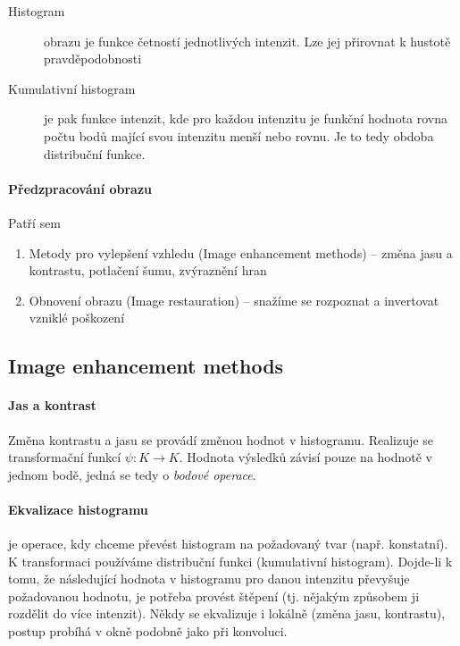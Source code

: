 \begin{description}
\item[Histogram] obrazu je funkce četností jednotlivých intenzit. Lze jej přirovnat k hustotě pravděpodobnosti
\item[Kumulativní histogram] je pak funkce intenzit, kde pro každou intenzitu je funkční hodnota rovna počtu bodů
 mající svou intenzitu menší nebo rovnu. Je to tedy obdoba distribuční funkce.
\end{description} 


\paragraph{Předzpracování obrazu}

Patří sem
\begin{enumerate}
\item Metody pro vylepšení vzhledu (Image enhancement methods) -- změna jasu a kontrastu, potlačení šumu, zvýraznění hran
\item Obnovení obrazu (Image restauration) -- snažíme se rozpoznat a invertovat vzniklé poškození
\end{enumerate}

\subsection{Image enhancement methods} 
\paragraph{Jas a kontrast}
Změna kontrastu a jasu se provádí změnou hodnot v histogramu. Realizuje se transformační funkcí $\psi:K\rightarrow K$.
Hodnota výsledků závisí pouze na hodnotě v jednom bodě, jedná se tedy o {\em bodové operace}.


\paragraph{Ekvalizace histogramu} je operace, kdy chceme převést histogram na požadovaný tvar (např. konstatní). K transformaci 
používáme distribuční funkci (kumulativní histogram). Dojde-li k tomu, že následující hodnota v histogramu pro 
danou intenzitu převyšuje požadovanou hodnotu, je potřeba provést štěpení (tj. nějakým způsobem ji rozdělit
do více intenzit). Někdy se ekvalizuje i lokálně (změna jasu, kontrastu), postup probíhá v okně podobně jako při konvoluci.

